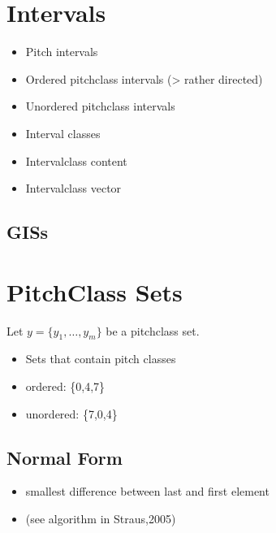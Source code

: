 \documentclass[letterpaper,10pt,english]{sphinxmanual}
\begin{document}
\section{Intervals}
\label{\detokenize{1_fundamentals:intervals}}\begin{itemize}
\item {} 
Pitch intervals

\item {} 
Ordered pitch\sphinxhyphen{}class intervals (\sphinxhyphen{}\textgreater{} rather directed)

\item {} 
Unordered pitch\sphinxhyphen{}class intervals

\item {} 
Interval classes

\item {} 
Interval\sphinxhyphen{}class content

\item {} 
Interval\sphinxhyphen{}class vector

\end{itemize}


\subsection{GISs}
\label{\detokenize{1_fundamentals:giss}}

\section{Pitch\sphinxhyphen{}Class Sets}
\label{\detokenize{1_fundamentals:pitch-class-sets}}
Let \(y=\{y_1,\ldots,y_m\}\) be a pitch\sphinxhyphen{}class set.
\begin{itemize}
\item {} 
Sets that contain pitch classes

\item {} 
ordered: \{0,4,7\}

\item {} 
unordered: \{7,0,4\}

\end{itemize}


\subsection{Normal Form}
\label{\detokenize{1_fundamentals:normal-form}}\begin{itemize}
\item {} 
smallest difference between last and first element

\item {} 
(see algorithm in Straus,2005)

\end{itemize}
\end{document}

